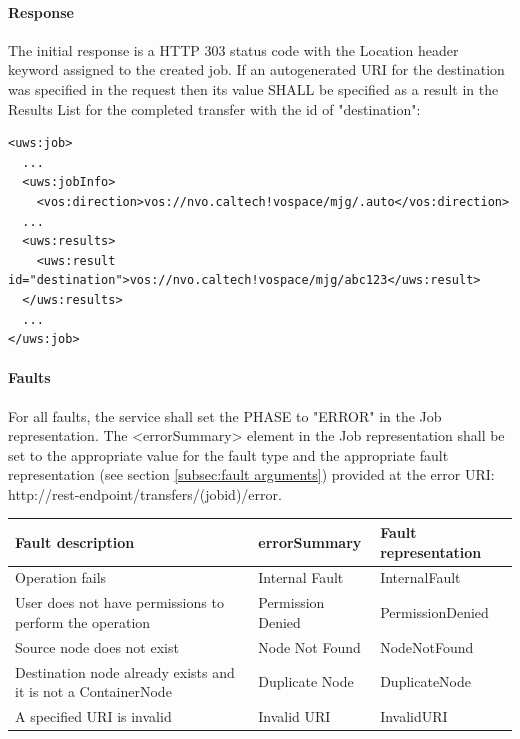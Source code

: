 \documentclass[11pt,a4paper]{ivoa}
\begin{document}
\paragraph{Response}
The initial response is a HTTP 303 status code with the Location header keyword assigned to the created job.
If an autogenerated URI for the destination was specified in the request then its value SHALL be specified as a result in the Results List for the completed transfer with the id of "destination":

\begin{lstlisting}
<uws:job>
  ...
  <uws:jobInfo>
    <vos:direction>vos://nvo.caltech!vospace/mjg/.auto</vos:direction>
  ...
  <uws:results>
    <uws:result id="destination">vos://nvo.caltech!vospace/mjg/abc123</uws:result>
  </uws:results>
  ...
</uws:job>
\end{lstlisting}

\paragraph{Faults}
For all faults, the service shall set the PHASE to "ERROR" in the Job representation. The <errorSummary> element in the Job representation shall be set to the appropriate value for the fault type and the appropriate fault representation (see section \ref{subsec:fault arguments}) provided at the error URI: http://rest-endpoint/transfers/(jobid)/error.

\vspace{3mm}
\begin{tabular}{ p{5cm} l p{4cm} }
\textbf{Fault description} & \textbf{errorSummary} & \textbf{Fault representation} \\
\hline
Operation fails & Internal Fault & InternalFault \\
\hline
User does not have permissions to perform the operation & Permission Denied & PermissionDenied \\
\hline
Source node does not exist & Node Not Found & NodeNotFound \\
\hline
Destination node already exists and it is not a ContainerNode & Duplicate Node & DuplicateNode \\
\hline
A specified URI is invalid & Invalid URI & InvalidURI \\
\hline
\end{tabular}
\vspace{3mm}
\end{document}
